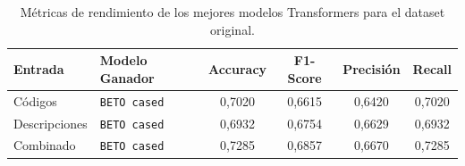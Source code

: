 \documentclass[12pt,a4paper,onecolumn,oneside]{report}
\begin{document}

\begin{table}[htbp]
\centering
\small
\renewcommand{\arraystretch}{1.25}
\begin{tabular}{|l|l|c|c|c|c|}
\hline
\rowcolor[RGB]{239,239,239}
\textbf{Entrada} & \textbf{Modelo Ganador} & \textbf{Accuracy} & \textbf{F1-Score} & \textbf{Precisión} & \textbf{Recall} \\ \hline

Códigos & \texttt{BETO cased} & 0,7020 & 0,6615 & 0,6420 & 0,7020 \\
Descripciones & \texttt{BETO cased} & 0,6932 & 0,6754 & 0,6629 & 0,6932 \\ 
Combinado & \texttt{BETO cased} & 0,7285 & 0,6857 & 0,6670 & 0,7285 \\ \hline


\end{tabular}
\caption{Métricas de rendimiento de los mejores modelos Transformers para el dataset original.}
\label{tab:comparativa_nlp_metricas_original}
\end{table}
\end{document}
